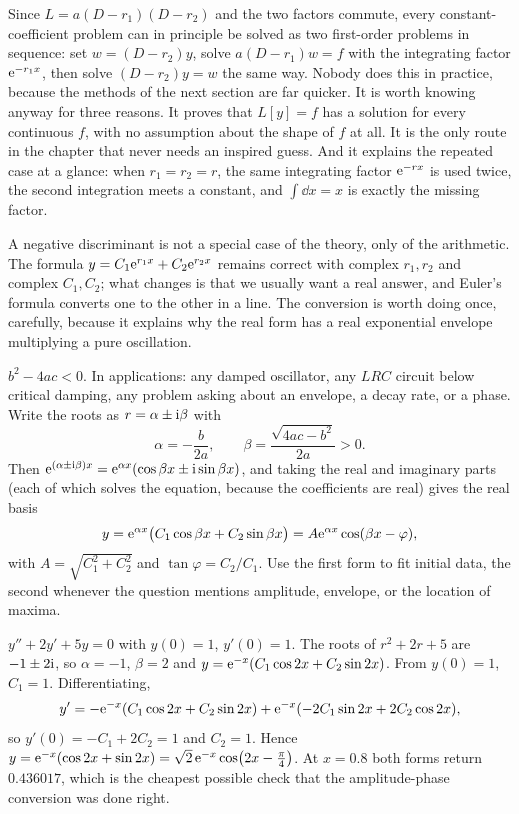 \begin{keynote}
Since $L=a(D-r_1)(D-r_2)$ and the two factors commute, every constant-coefficient problem can in principle be solved as two first-order problems in sequence: set $w=(D-r_2)y$, solve $a(D-r_1)w=f$ with the integrating factor $\mathrm{e}^{-r_1x}$, then solve $(D-r_2)y=w$ the same way. Nobody does this in practice, because the methods of the next section are far quicker. It is worth knowing anyway for three reasons. It proves that $L[y]=f$ has a solution for every continuous $f$, with no assumption about the shape of $f$ at all. It is the only route in the chapter that never needs an inspired guess. And it explains the repeated case at a glance: when $r_1=r_2=r$, the same integrating factor $\mathrm{e}^{-rx}$ is used twice, the second integration meets a constant, and $\int\dd x=x$ is exactly the missing factor.
\end{keynote}

A negative discriminant is not a special case of the theory, only of the arithmetic. The formula $y=C_1\mathrm{e}^{r_1x}+C_2\mathrm{e}^{r_2x}$ remains correct with complex $r_1,r_2$ and complex $C_1,C_2$; what changes is that we usually want a real answer, and Euler's formula converts one to the other in a line. The conversion is worth doing once, carefully, because it explains why the real form has a real exponential envelope multiplying a pure oscillation.

\cue $b^{2}-4ac<0$. In applications: any damped oscillator, any $LRC$ circuit below critical damping, any problem asking about an envelope, a decay rate, or a phase.
\method Write the roots as $r=\alpha\pm\mathrm{i}\beta$ with
\[\alpha=-\frac{b}{2a},\qquad \beta=\frac{\sqrt{4ac-b^{2}}}{2a}>0.\]
Then $\mathrm{e}^{(\alpha\pm\mathrm{i}\beta)x}=\mathrm{e}^{\alpha x}(\cos\beta x\pm\mathrm{i}\sin\beta x)$, and taking the real and imaginary parts (each of which solves the equation, because the coefficients are real) gives the real basis
\[y=\mathrm{e}^{\alpha x}\bigl(C_1\cos\beta x+C_2\sin\beta x\bigr)=A\mathrm{e}^{\alpha x}\cos(\beta x-\varphi),\]
with $A=\sqrt{C_1^{2}+C_2^{2}}$ and $\tan\varphi=C_2/C_1$. Use the first form to fit initial data, the second whenever the question mentions amplitude, envelope, or the location of maxima.

\begin{worked}
$y''+2y'+5y=0$ with $y(0)=1$, $y'(0)=1$. The roots of $r^{2}+2r+5$ are $-1\pm2\mathrm{i}$, so $\alpha=-1$, $\beta=2$ and $y=\mathrm{e}^{-x}(C_1\cos2x+C_2\sin2x)$. From $y(0)=1$, $C_1=1$. Differentiating,
\[y'=-\mathrm{e}^{-x}(C_1\cos2x+C_2\sin2x)+\mathrm{e}^{-x}(-2C_1\sin2x+2C_2\cos2x),\]
so $y'(0)=-C_1+2C_2=1$ and $C_2=1$. Hence $y=\mathrm{e}^{-x}(\cos2x+\sin2x)=\sqrt2\,\mathrm{e}^{-x}\cos\bigl(2x-\tfrac{\pi}{4}\bigr)$. At $x=0.8$ both forms return $0.436017$, which is the cheapest possible check that the amplitude-phase conversion was done right.
\end{worked}

